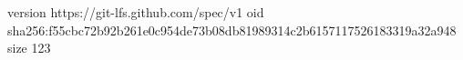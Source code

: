 version https://git-lfs.github.com/spec/v1
oid sha256:f55cbc72b92b261e0c954de73b08db81989314c2b6157117526183319a32a948
size 123
